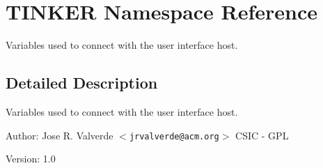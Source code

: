 \section{TINKER Namespace Reference}
\label{namespaceTINKER}
Variables used to connect with the user interface host.  




\subsection{Detailed Description}
Variables used to connect with the user interface host. 

\begin{Desc}
\item[Author:]Jose R. Valverde $<${\tt jrvalverde@acm.org}$>$  CSIC - GPL \end{Desc}
\begin{Desc}
\item[Version:]1.0 \end{Desc}


